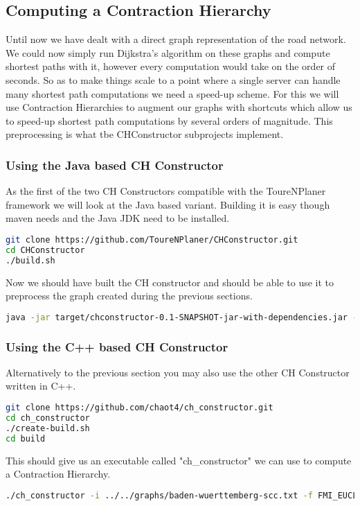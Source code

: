 \documentclass[titlepage,parskip=true]{scrartcl}
\begin{document}
\subsection{Computing a Contraction Hierarchy}
Until now we have dealt with a direct graph representation of the road network.
We could now simply run Dijkstra's algorithm on these graphs and compute
shortest paths with it, however every computation would take on the order of
seconds. So as to make things scale to a point where a single server can handle
many shortest path computations we need a speed-up scheme.  For this we will
use Contraction Hierarchies to augment our graphs with shortcuts which allow us
to speed-up shortest path computations by several orders of magnitude. This
preprocessing is what tbe CHConstructor subprojects implement.
\subsubsection{Using the Java based CH Constructor}
As the first of the two CH Constructors compatible with the ToureNPlaner framework
we will look at the Java based variant. Building it is easy though maven needs and the
Java JDK need to be installed.
\begin{lstlisting}[language=bash]
git clone https://github.com/ToureNPlaner/CHConstructor.git
cd CHConstructor
./build.sh
\end{lstlisting}
Now we should have built the CH constructor and should be able to use it to
preprocess the graph created during the previous sections.
\begin{lstlisting}[language=bash]
java -jar target/chconstructor-0.1-SNAPSHOT-jar-with-dependencies.jar -if standard -i ../graphs/baden-wuerttemberg-scc.txt -of standard -o ../graphs/baden-wuerttemberg-ch.txt
\end{lstlisting}
\subsubsection{Using the C++ based CH Constructor}
Alternatively to the previous section you may also use the other CH Constructor written in C++.
\begin{lstlisting}[language=bash]
git clone https://github.com/chaot4/ch_constructor.git
cd ch_constructor
./create-build.sh
cd build
\end{lstlisting}
This should give us an executable called "ch\_constructor" we can use to compute
a Contraction Hierarchy.
\begin{lstlisting}[language=bash]
./ch_constructor -i ../../graphs/baden-wuerttemberg-scc.txt -f FMI_EUCL -o ../../graphs/baden-wuerttemberg-ch2.txt -g FMI_EUCL_CH
\end{lstlisting}
\end{document}
